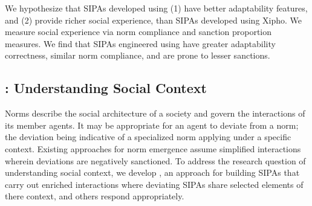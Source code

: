 We hypothesize that SIPAs developed using \frameworkA (1) have better
adaptability features, and (2) provide richer social experience, than
SIPAs developed using Xipho. We measure social experience via norm
compliance and sanction proportion measures. We find that SIPAs
engineered using \frameworkA have greater adaptability correctness,
similar norm compliance, and are prone to lesser sanctions.

\subsection[Understanding Social Context]{\frameworkB: Understanding Social Context}



Norms describe the social architecture of a society
and govern the interactions of its member agents.
It may be appropriate for an agent to deviate from
a norm; the deviation being indicative of a specialized
norm applying under a specific context. Existing
approaches for norm emergence assume simplified
interactions wherein deviations are negatively
sanctioned. To address the research question of understanding
social context, we develop \frameworkB, an approach for
building SIPAs that carry out enriched interactions
where deviating SIPAs share selected elements of there 
context, and others respond appropriately.

